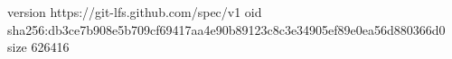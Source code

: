 version https://git-lfs.github.com/spec/v1
oid sha256:db3ce7b908e5b709cf69417aa4e90b89123c8c3e34905ef89e0ea56d880366d0
size 626416
